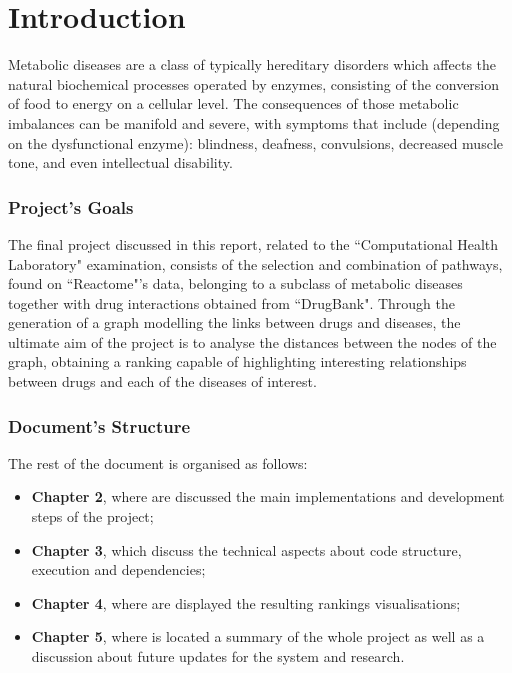 \chapter{Introduction}\label{chap:intro}

Metabolic diseases are a class of typically hereditary disorders which affects the natural biochemical processes operated by enzymes, consisting of the conversion of food to energy on a cellular level. The consequences of those metabolic imbalances can be manifold and severe, with symptoms that include (depending on the dysfunctional enzyme): blindness, deafness, convulsions, decreased muscle tone, and even intellectual disability\cite{britannica}.

\subsection{Project's Goals}

The final project discussed in this report, related to the ``Computational Health Laboratory" examination, consists of the selection and combination of pathways, found on ``Reactome"\cite{reactome}'s data, belonging to a subclass of metabolic diseases together with drug interactions obtained from ``DrugBank"\cite{drugbank}. Through the generation of a graph modelling the links between drugs and diseases, the ultimate aim of the project is to analyse the distances between the nodes of the graph, obtaining a ranking capable of highlighting interesting relationships between drugs and each of the diseases of interest.

\subsection{Document's Structure}
The rest of the document is organised as follows:
\begin{itemize}
\item \textbf{Chapter 2}, where are discussed the main implementations and development steps of the project;
\item \textbf{Chapter 3}, which discuss the technical aspects about code structure, execution and dependencies;
\item \textbf{Chapter 4}, where are displayed the resulting rankings visualisations;
\item \textbf{Chapter 5}, where is located a summary of the whole project as well as a discussion about future updates for the system and research.
\end{itemize}